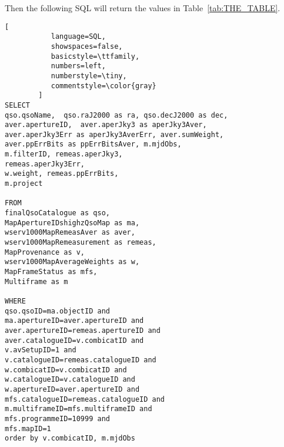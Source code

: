 \lstset{upquote=true}

\noindent
Then the following SQL will return the values in
Table~\ref{tab:THE_TABLE}.

\begin{lstlisting}[
           language=SQL,
           showspaces=false,
           basicstyle=\ttfamily,
           numbers=left,
           numberstyle=\tiny,
           commentstyle=\color{gray}
        ]
SELECT 
qso.qsoName,  qso.raJ2000 as ra, qso.decJ2000 as dec, 
aver.apertureID,  aver.aperJky3 as aperJky3Aver, 
aver.aperJky3Err as aperJky3AverErr, aver.sumWeight, 
aver.ppErrBits as ppErrBitsAver, m.mjdObs, 
m.filterID, remeas.aperJky3, 
remeas.aperJky3Err, 
w.weight, remeas.ppErrBits, 
m.project

FROM 
finalQsoCatalogue as qso,  
MapApertureIDshighzQsoMap as ma,  
wserv1000MapRemeasAver as aver,  
wserv1000MapRemeasurement as remeas,  
MapProvenance as v,  
wserv1000MapAverageWeights as w, 
MapFrameStatus as mfs, 
Multiframe as m  

WHERE 
qso.qsoID=ma.objectID and 
ma.apertureID=aver.apertureID and 
aver.apertureID=remeas.apertureID and 
aver.catalogueID=v.combicatID and 
v.avSetupID=1 and 
v.catalogueID=remeas.catalogueID and 
w.combicatID=v.combicatID and 
w.catalogueID=v.catalogueID and 
w.apertureID=aver.apertureID and 
mfs.catalogueID=remeas.catalogueID and 
m.multiframeID=mfs.multiframeID and 
mfs.programmeID=10999 and 
mfs.mapID=1 
order by v.combicatID, m.mjdObs
\end{lstlisting}
